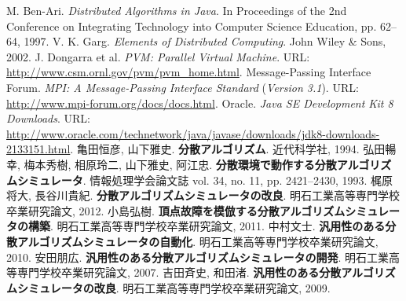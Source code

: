 \begin{thebibliography}{99}
   M. Ben-Ari. {\it Distributed Algorithms in Java}. In Proceedings of the 2nd Conference on Integrating Technology into Computer Science Education, pp. 62--64, 1997.
	 V. K. Garg. {\it Elements of Distributed Computing}. John Wiley \& Sons, 2002.
	 J. Dongarra et al. {\it PVM: Parallel Virtual Machine}. URL: \url{http://www.csm.ornl.gov/pvm/pvm_home.html}.
	 Message-Passing Interface Forum. {\it MPI: A Message-Passing Interface Standard} ({\it Version 3.1}). URL: \url{http://www.mpi-forum.org/docs/docs.html}.
	 Oracle. {\it Java SE Development Kit 8 Downloads}. URL: \url{http://www.oracle.com/technetwork/java/javase/downloads/jdk8-downloads-2133151.html}.
	 亀田恒彦, 山下雅史. {\bf 分散アルゴリズム}. 近代科学社, 1994.
	 弘田暢幸, 梅本秀樹, 相原玲二, 山下雅史, 阿江忠. {\bf 分散環境で動作する分散アルゴリズムシミュレータ}. 情報処理学会論文誌 vol. 34, no. 11, pp. 2421--2430, 1993.
	 梶原将大, 長谷川貴紀. {\bf 分散アルゴリズムシミュレータの改良}. 明石工業高等専門学校卒業研究論文, 2012.
	 小島弘樹. {\bf 頂点故障を模倣する分散アルゴリズムシミュレータの構築}. 明石工業高等専門学校卒業研究論文, 2011.
	 中村文士. {\bf 汎用性のある分散アルゴリズムシミュレータの自動化}. 明石工業高等専門学校卒業研究論文, 2010.
	 安田朋広. {\bf 汎用性のある分散アルゴリズムシミュレータの開発}. 明石工業高等専門学校卒業研究論文, 2007.
	 吉田斉史, 和田渚. {\bf 汎用性のある分散アルゴリズムシミュレータの改良}. 明石工業高等専門学校卒業研究論文, 2009.
\end{thebibliography}
